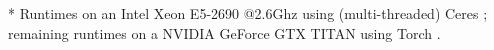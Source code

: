 \begin{table*}
{    %
    * Runtimes on an Intel\textregistered\xspace Xeon\textregistered\xspace E5-2690 @2.6Ghz using (multi-threaded) Ceres \cite{Agarwal2012}; remaining runtimes on a NVIDIA\texttrademark\xspace GeForce\textregistered\xspace GTX TITAN using Torch \cite{Collobert2011}.}
    \label{table:experiments-shapenet-kitti}
\end{table*}